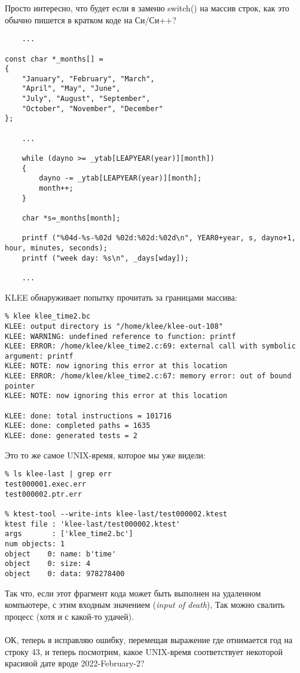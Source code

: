 Просто интересно, что будет если я заменю switch() на массив строк, как это обычно пишется в кратком коде на Си/Си++?

\begin{lstlisting}
	...

const char *_months[] =
{
	"January", "February", "March",
	"April", "May", "June",
	"July", "August", "September",
	"October", "November", "December"
};

	...

	while (dayno >= _ytab[LEAPYEAR(year)][month])
	{
		dayno -= _ytab[LEAPYEAR(year)][month];
		month++;
	}
	
	char *s=_months[month];

	printf ("%04d-%s-%02d %02d:%02d:%02d\n", YEAR0+year, s, dayno+1, hour, minutes, seconds);
	printf ("week day: %s\n", _days[wday]);	
	
	...

\end{lstlisting}

KLEE обнаруживает попытку прочитать за границами массива:

\begin{lstlisting}
% klee klee_time2.bc
KLEE: output directory is "/home/klee/klee-out-108"
KLEE: WARNING: undefined reference to function: printf
KLEE: ERROR: /home/klee/klee_time2.c:69: external call with symbolic argument: printf
KLEE: NOTE: now ignoring this error at this location
KLEE: ERROR: /home/klee/klee_time2.c:67: memory error: out of bound pointer
KLEE: NOTE: now ignoring this error at this location

KLEE: done: total instructions = 101716
KLEE: done: completed paths = 1635
KLEE: done: generated tests = 2
\end{lstlisting}

Это то же самое UNIX-время, которое мы уже видели:

\begin{lstlisting}
% ls klee-last | grep err
test000001.exec.err
test000002.ptr.err

% ktest-tool --write-ints klee-last/test000002.ktest
ktest file : 'klee-last/test000002.ktest'
args       : ['klee_time2.bc']
num objects: 1
object    0: name: b'time'
object    0: size: 4
object    0: data: 978278400
\end{lstlisting}

Так что, если этот фрагмент кода может быть выполнен на удаленном компьютере, с этим входным значением
(\textit{input of death}),
Так можно свалить процесс (хотя и с какой-то удачей).\\
\\
ОК, теперь я исправляю ошибку, перемещая выражение где отнимается год на строку 43, и теперь посмотрим,
какое UNIX-время соответствует некоторой красивой дате вроде 2022-February-2?


